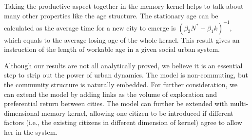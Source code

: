 \documentclass[reprint,unsortedaddress,amsmath,amssymb,aps,prl,showkeys]{revtex4-2}
\begin{document}
Taking the productive aspect together in the memory kernel helps to talk about many other properties like the age structure. The stationary age can be calculated as the average time for a new city to emerge is $(\beta_2 N^* + \beta_1 k)^{-1}$, which equals to the average losing age of the whole kernel. This result gives an instruction of the length of workable age in a given social urban system.

Although our results are not all analytically proved, we believe it is an essential step to strip out the power of urban dynamics. The model is non-commuting, but the community structure is naturally embedded. For further consideration, we can extend the model by adding links as the volume of exploration and preferential return between cities\cite{WANG2019121921}. The model can further be extended with multi-dimensional memory kernel, allowing one citizen to be introduced if different factors\cite{doi:10.1098/rsif.2019.0564} (i.e., the existing citizens in different dimension of kernel) agree to allow her in the system.




\end{document}
